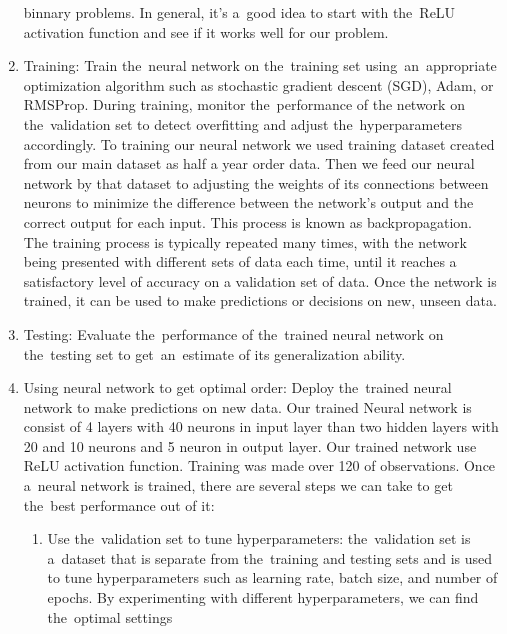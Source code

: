 \begin{enumerate}
            binnary problems. In general, it's a~good idea to start with the~ReLU activation function and see if it works
            well for our problem.\\
            \item Training: Train the~neural network on the~training set using~an~appropriate optimization algorithm
            such as stochastic gradient descent (SGD), Adam, or RMSProp. During training, monitor the~performance of the
            network on the~validation set to detect overfitting and adjust the~hyperparameters accordingly.
            To training our neural network we used training dataset created from our main dataset as half a year order data.
            Then we feed our neural network by that dataset to adjusting the weights of its connections between neurons to
            minimize the difference between the network's output and the correct output for each input. This process is
            known as backpropagation.\\
            The training process is typically repeated many times, with the network being presented with different
            sets of data each time, until it reaches a satisfactory level of accuracy on a validation set of data.
            Once the network is trained, it can be used to make predictions or decisions on new, unseen data.\\
            \item Testing: Evaluate the~performance of the~trained neural network on the~testing set
            to get~an~estimate of its generalization ability.
            \item Using neural network to get optimal order: Deploy the~trained neural network to
            make predictions on new data. Our trained Neural network is consist of 4 layers with 40 neurons in input
            layer than two hidden layers with 20 and 10 neurons and 5 neuron in output layer. Our trained network
            use ReLU activation function. Training was made over 120 of observations.
            Once a~neural network is trained, there are several steps we can take to get the~best performance out of it:
            \begin{enumerate}[label=\alph*]
                \item Use the~validation set to tune hyperparameters: the~validation set is a~dataset that is separate
                from the~training and testing sets and is used to tune hyperparameters such as learning rate, batch size,
                and number of epochs. By experimenting with different hyperparameters, we can find the~optimal settings

\end{enumerate}
\end{enumerate}

